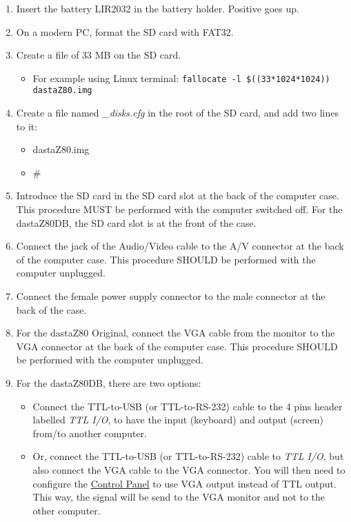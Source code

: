 \begin{enumerate}
    \item Insert the battery LIR2032 in the battery holder. Positive goes up.
    \item On a modern PC, format the SD card with FAT32.
    \item Create a file of 33 MB on the SD card.
    \begin{itemize}
        \item For example using Linux terminal: \texttt{fallocate -l \$((33*1024*1024)) dastaZ80.img}
    \end{itemize}
    \item Create a file named \textit{\_disks.cfg} in the root of the SD card,
    and add two lines to it:
    \begin{itemize}
        \item dastaZ80.img
        \item \#
    \end{itemize}
    \item Introduce the SD card in the SD card slot at the back of the
        computer case. This procedure MUST be performed with the computer
        switched off. For the dastaZ80DB, the SD card slot is at the front of
        the case.
    \item Connect the jack of the Audio/Video cable to the A/V connector at
        the back of the computer case. This procedure SHOULD be performed with
        the computer unplugged.
    \item Connect the female power supply connector to the male connector at
        the back of the case.
    \item For the dastaZ80 Original, connect the VGA cable from the monitor to
        the VGA connector at the back of the computer case. This procedure
        SHOULD be performed with the computer unplugged.
    \item For the dastaZ80DB, there are two options:
    \begin{itemize}
        \item Connect the TTL-to-USB (or TTL-to-RS-232) cable to the 4 pins
            header labelled \textit{TTL I/O}, to have the input (keyboard) and
            output (screen) from/to another computer.
        \item Or, connect the TTL-to-USB (or TTL-to-RS-232) cable to
            \textit{TTL I/O}, but also connect the VGA cable to the VGA
            connector. You will then need to configure the 
            \hyperref[subsubsec:controlpanel]{Control Panel} to use VGA output
            instead of TTL output. This way, the signal will be send to the VGA
            monitor and not to the other computer.
    \end{itemize}
\end{enumerate}

